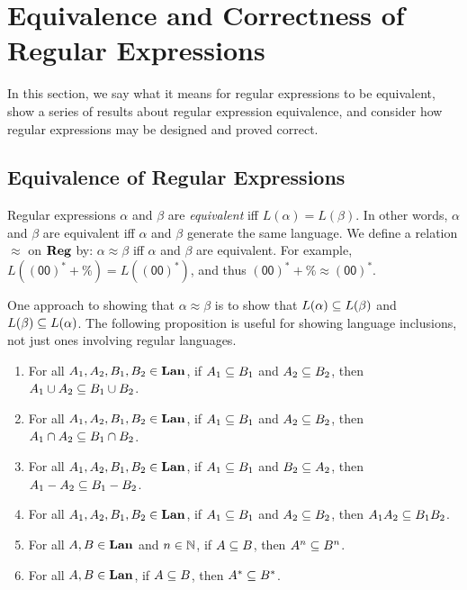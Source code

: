 \section{Equivalence and  Correctness of Regular  Expressions}
\label{EquivalenceOfRegularExpressions}

%
In this section, we say what it means for regular expressions to be
equivalent, show a series of results about regular expression
equivalence, and consider how regular expressions may be designed and
proved correct.

\subsection{Equivalence of Regular Expressions}

Regular expressions $\alpha$ and $\beta$ are
%
%
%
\emph{equivalent} iff $L(\alpha) = L(\beta)$.  In other words, $\alpha$
and $\beta$ are equivalent iff $\alpha$ and $\beta$ generate the same
language.  We define a relation $\approx$ on $\mathbf{Reg}$ by:
$\alpha\approx\beta$ iff $\alpha$ and $\beta$ are equivalent.
For example, $L(\mathsf{(00)}^*+\%)=L(\mathsf{{(00)}^*})$,
and thus $\mathsf{(00)}^*+\%\approx\mathsf{(00)^*}$.

One approach to showing that $\alpha\approx\beta$ is to show that
$L(\alpha)\subseteq L(\beta)$ and $L(\beta)\subseteq L(\alpha)$.  The
%
%
following proposition is useful for showing language inclusions, not just
ones involving regular languages.

\begin{proposition}
\label{Inclusions}

\begin{enumerate}[(1)]
\item For all $A_1,A_2,B_1,B_2\in\mathbf{Lan}$, if
$A_1\subseteq B_1$ and $A_2\subseteq B_2$, then $A_1\cup A_2\subseteq B_1\cup B_2$.

\item For all $A_1,A_2,B_1,B_2\in\mathbf{Lan}$, if
$A_1\subseteq B_1$ and $A_2\subseteq B_2$, then $A_1\cap A_2\subseteq B_1\cap B_2$.

\item For all $A_1,A_2,B_1,B_2\in\mathbf{Lan}$, if
$A_1\subseteq B_1$ and $B_2\subseteq A_2$, then $A_1-A_2\subseteq B_1-B_2$.

\item For all $A_1,A_2,B_1,B_2\in\mathbf{Lan}$, if
$A_1\subseteq B_1$ and $A_2\subseteq B_2$, then $A_1A_2\subseteq B_1B_2$.

\item For all $A,B\in\mathbf{Lan}$ and $n\in\mathbb{N}$,
if $A\subseteq B$, then $A^n\subseteq B^n$.

\item For all $A,B\in\mathbf{Lan}$, if $A\subseteq B$, then $A^*\subseteq B^*$.
\end{enumerate}
\end{proposition}

